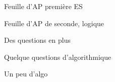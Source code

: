 
\begin{feuilleExo}{Feuille d'AP première ES}
\end{feuilleExo}


\begin{feuilleExo}{Feuille d'AP de seconde, logique}
\end{feuilleExo}

\begin{feuilleExo}{Des questions en plus}


\end{feuilleExo}


\begin{feuilleExo}{Quelque questions d'algorithmique}
\end{feuilleExo}

\begin{feuilleExo}{Un peu d'algo}
\end{feuilleExo}



